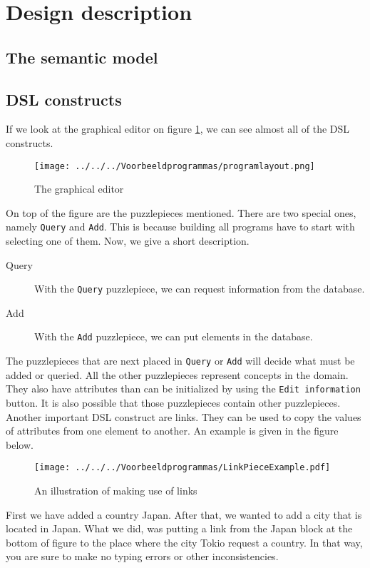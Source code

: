 \section{Design description}
\subsection{The semantic model}
\subsection{DSL constructs}
If we look at the graphical editor on figure \ref{ex:DSLlayoutinDD}, we can see almost all of the DSL constructs.
\begin{figure}[H]
	\centering
	\texttt{[image: ../../../Voorbeeldprogrammas/programlayout.png]}
	\caption{The graphical editor}
	\label{ex:DSLlayoutinDD}
\end{figure}
\noindent On top of the figure are the puzzlepieces mentioned. There are two special ones, namely \texttt{Query} and \texttt{Add}. This is because building all programs have to start with selecting one of them.  Now, we give a short description.
\begin{description}
 \item[Query] With the \texttt{Query} puzzlepiece, we can request information from the database.
 \item[Add] With the \texttt{Add} puzzlepiece, we can put elements in the database.  
\end{description}
The puzzlepieces that are next placed in \texttt{Query} or \texttt{Add} will decide what must be added or queried.
All the other puzzlepieces represent concepts in the domain. They also have attributes than can be initialized by using the \texttt{Edit information} button. It is also possible that those puzzlepieces contain other puzzlepieces. 
Another important DSL construct are links. They can be used to copy the values of attributes from one element to another. An example is given in the figure below.
\begin{figure}[H]
	\centering
	\texttt{[image: ../../../Voorbeeldprogrammas/LinkPieceExample.pdf]}
	\caption{An illustration of making use of links}
	\label{ex:linkpieceexample}
\end{figure}
First we have added a country Japan. After that, we wanted to add a city that is located in Japan. What we did, was putting a link from the Japan block at the bottom of figure to the place where the city Tokio request a country. In that way, you are sure to make no typing errors or other inconsistencies.

